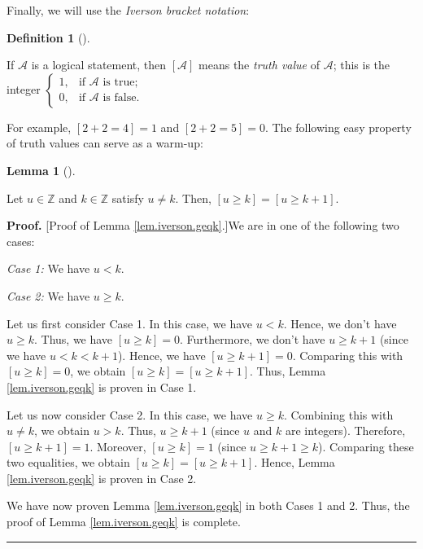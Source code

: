 \documentclass[numbers=enddot,12pt,final,onecolumn,notitlepage,english]{scrartcl}%
\theoremstyle{definition}
\newtheorem{lem}[theo]{Lemma}
\newenvironment{lemma}[1][]
{\begin{lem}[#1]\begin{leftbar}}
{\end{leftbar}\end{lem}}
\newtheorem{defi}[theo]{Definition}
\newenvironment{definition}[1][]
{\begin{defi}[#1]\begin{leftbar}}
{\end{leftbar}\end{defi}}
\newenvironment{proof}[1][Proof]{\noindent\textbf{#1.} }{\ \rule{0.5em}{0.5em}}
\newenvironment{verlong}{}{}
\begin{document}
Finally, we will use the \emph{Iverson bracket notation}:

\begin{definition}
\label{def.iverson}If $\mathcal{A}$ is a logical statement, then $\left[
\mathcal{A}\right]  $ means the \emph{truth value} of $\mathcal{A}$; this is
the integer $%
\begin{cases}
1, & \text{if }\mathcal{A}\text{ is true};\\
0, & \text{if }\mathcal{A}\text{ is false}.
\end{cases}
$
\end{definition}

For example, $\left[  2+2=4\right]  =1$ and $\left[  2+2=5\right]  =0$. The
following easy property of truth values can serve as a warm-up:

\begin{lemma}
\label{lem.iverson.geqk}Let $u\in\mathbb{Z}$ and $k\in\mathbb{Z}$ satisfy
$u\neq k$. Then, $\left[  u\geq k\right]  =\left[  u\geq k+1\right]  $.
\end{lemma}

\begin{verlong}
\begin{proof}
[Proof of Lemma \ref{lem.iverson.geqk}.]We are in one of the following two cases:

\textit{Case 1:} We have $u<k$.

\textit{Case 2:} We have $u\geq k$.\medskip

Let us first consider Case 1. In this case, we have $u<k$. Hence, we don't
have $u\geq k$. Thus, we have $\left[  u\geq k\right]  =0$. Furthermore, we
don't have $u\geq k+1$ (since we have $u<k<k+1$). Hence, we have $\left[
u\geq k+1\right]  =0$. Comparing this with $\left[  u\geq k\right]  =0$, we
obtain $\left[  u\geq k\right]  =\left[  u\geq k+1\right]  $. Thus, Lemma
\ref{lem.iverson.geqk} is proven in Case 1. \medskip

Let us now consider Case 2. In this case, we have $u\geq k$. Combining this
with $u\neq k$, we obtain $u>k$. Thus, $u\geq k+1$ (since $u$ and $k$ are
integers). Therefore, $\left[  u\geq k+1\right]  =1$. Moreover, $\left[  u\geq
k\right]  =1$ (since $u\geq k+1\geq k$). Comparing these two equalities, we
obtain $\left[  u\geq k\right]  =\left[  u\geq k+1\right]  $. Hence, Lemma
\ref{lem.iverson.geqk} is proven in Case 2. \medskip

We have now proven Lemma \ref{lem.iverson.geqk} in both Cases 1 and 2. Thus,
the proof of Lemma \ref{lem.iverson.geqk} is complete.
\end{proof}
\end{verlong}
\end{document}
